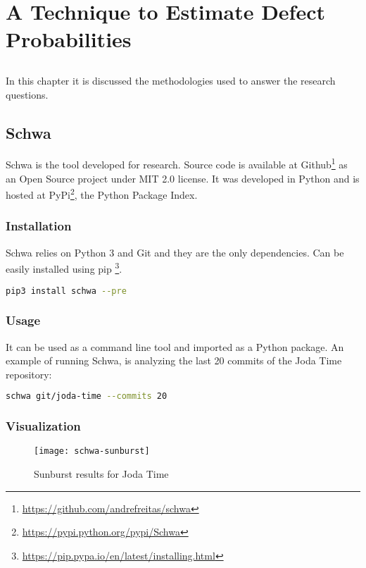 \chapter{A Technique to Estimate Defect Probabilities} \label{chap:methods}

\section*{}
In this chapter it is discussed the methodologies used to answer the research
 questions.

\section{Schwa}
Schwa is the tool developed for research. Source code is available at
Github\footnote{\url{https://github.com/andrefreitas/schwa}} as an Open Source
project under MIT 2.0 license. It was developed in Python and is hosted at
PyPi\footnote{\url{https://pypi.python.org/pypi/Schwa}}, the Python Package
Index.

\subsection{Installation}
Schwa relies on Python 3 and Git and they are the only dependencies. Can be
easily installed using pip
\footnote{\url{https://pip.pypa.io/en/latest/installing.html}}.

\begin{lstlisting}[language=bash, caption=Schwa installation command]
   pip3 install schwa --pre
\end{lstlisting}

\subsection{Usage}
It can be used as a command line tool and imported as a Python package.
An example of running Schwa, is analyzing the last 20 commits of the Joda Time
repository:

\begin{lstlisting}[language=bash, caption=Running Schwa on Joda Time]
  schwa git/joda-time --commits 20
\end{lstlisting}

\subsection{Visualization}

\begin{figure}[H]
    \begin{center}
        \texttt{[image: schwa-sunburst]}
        \caption{Sunburst results for Joda Time}
        \label{figure:sunburst-joda}
    \end{center}
\end{figure}

